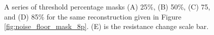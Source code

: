 \begin{figure}[H]
\begin{minipage}[t]{.3\textwidth}
        \hfill
    \end{minipage}
    \hspace{0.05\linewidth}
    \begin{minipage}[t]{.1\textwidth}
        \vspace{1cm}
        \hfill
    \end{minipage}  
\caption{A series of threshold percentage masks (A) 25\%, (B) 50\%, (C) 75, and (D) 85\% for the same reconstruction given in Figure \ref{fig:noise_floor_mask_8p}. (E) is the resistance change scale bar.}
\label{fig:thresh_masks_8p}
\end{figure}
